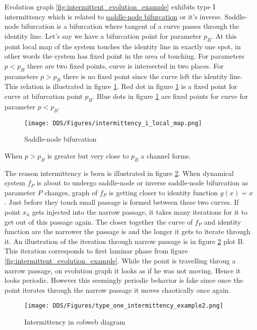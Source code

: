 Evolution graph \ref{fig:intermittent_evolution_example} exhibits type I intermittency which is related to \hyperref[def:saddle_node_bif]{saddle-node bifurcation} or it's inverse.
Saddle-node bifurcation is a bifurcation where tangent of a curve passes through the identity line.
Let's say we have a bifurcation point for parameter $p_{B}$.
At this point local map of the system touches the identity line in exactly one spot, in other words the system has fixed point in the area of touching.
For parameters $p < p_{B}$ there are two fixed points, curve is intersected in two places.
For parameters $p > p_{B}$ there is no fixed point since the curve left the identity line.
This relation is illustrated in figure \ref{fig:saddle_node_bifurcation}.
Red dot in figure \ref{fig:saddle_node_bifurcation} is a fixed point for curve at bifurcation point $p_{B}$.
Blue dots in figure \ref{fig:saddle_node_bifurcation} are fixed points for curve for parameter $p < p_{B}$.
\begin{figure}[!h]
    \centering
    \texttt{[image: DDS/Figures/intermittency\_i\_local\_map.png]}
    \caption{Saddle-node bifurcation}
    \label{fig:saddle_node_bifurcation}
\end{figure}

When $p > p_{B}$ is greater but very close to $p_{B}$ a channel forms.

The reason intermittency is born is illustrated in figure \ref{fig:intermittent_cobweb_example}.
When dynamical system $f_P$ is about to undergo saddle-node or inverse saddle-node bifurcation as parameter $P$ changes, graph of $f_P$ is getting closer to identity function $g(x)=x$.
Just before they touch small passage is formed between these two curves.
If point $x_n$ gets injected into the narrow passage, it takes many iterations for it to get out of this passage again.
The closer together the curve of $f_P$ and identity function are the narrower the passage is and the longer it gets to iterate through it.
An illustration of the iteration through narrow passage is in figure \ref{fig:intermittent_cobweb_example} plot B.
This iteration corresponds to first laminar phase from figure \ref{fig:intermittent_evolution_example}.
While the point is travelling throug a narrow passage, on evolution graph it looks as if he was not moving.
Hence it looks periodic.
However this seemingly periodic behavior is fake since once the point iterates through the narrow passage it moves chaotically once again.

\begin{figure}[!h]
    \centering
    \texttt{[image: DDS/Figures/type\_one\_intermittency\_example2.png]}
    \caption{Intermittency in cobweb diagram}
    \label{fig:intermittent_cobweb_example}
\end{figure}

